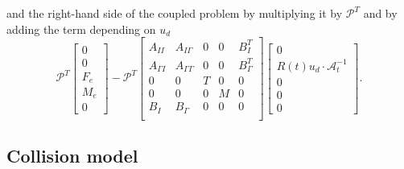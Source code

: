 \documentclass[graybox]{svmult}
\newcommand{\Alemap}{\mathcal{A}} %
\newcommand{\Vel}{u} %
\begin{document}
and the right-hand side of the coupled problem by multiplying it by $\mathcal{P}^T$ and by adding the term depending on $\Vel_d$
\begin{equation}
	\mathcal{P}^T 	\begin{bmatrix}
		0 \\
		0\\
		F_e
		\\
		M_e
		\\
		0
	\end{bmatrix} - \mathcal{P}^T \begin{bmatrix}
		A_{II} & A_{I\Gamma} & 0 & 0 & B_{I}^T  \\
		A_{\Gamma I} & A_{\Gamma \Gamma}  & 0 & 0 & B_{\Gamma}^T\\
		0 & 0 & T & 0 & 0 \\
		0 & 0 & 0& M 
		& 0\\
		B_I & B_\Gamma & 0 & 0 & 0   \\
	\end{bmatrix}\begin{bmatrix}
		0 \\
		R(t)u_d \cdot \Alemap^{-1}_t\\
		0
		\\
		0
		\\
		0
	\end{bmatrix}.
\end{equation}


\subsection{Collision model}
\end{document}
